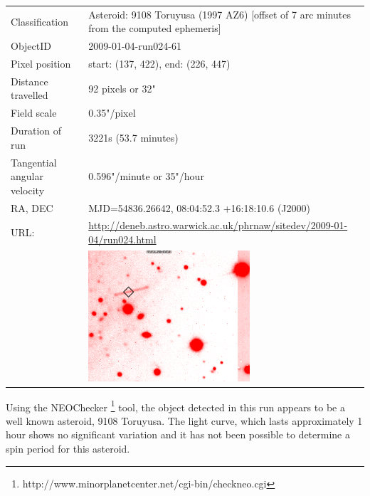   \newpage
  \begin{tabular}{l l}
  Classification & Asteroid: 9108 Toruyusa (1997 AZ6) [offset of 7 arc minutes from the computed ephemeris]\\
  ObjectID & 2009-01-04-run024-61 \\
  Pixel position & start: (137, 422), end: (226, 447) \\
  Distance travelled & 92 pixels or 32" \\
  Field scale & 0.35"/pixel \\
  Duration of run & 3221s (53.7 minutes) \\
  Tangential angular velocity & 0.596"/minute or 35"/hour\\ 
  RA, DEC & MJD=54836.26642, 08:04:52.3 +16:18:10.6 (J2000) \\
  URL: & \small \url{http://deneb.astro.warwick.ac.uk/phrnaw/sitedev/2009-01-04/run024.html} \\
       & \includegraphics[width=60mm]{images/2009-01-04-run024-61.png} \\
  \end{tabular}

  Using the NEOChecker \footnote{http://www.minorplanetcenter.net/cgi-bin/checkneo.cgi} tool, the object detected in this run appears to be a well known asteroid, 9108 Toruyusa. The light curve, which lasts approximately 1 hour shows no significant variation and it has not been possible to determine a spin period for this asteroid.  

  
